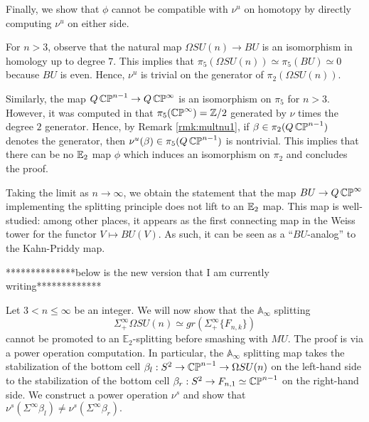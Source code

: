 Finally, we show that $\phi$ cannot be compatible with $\nu^u$ on homotopy by directly computing $\nu^u$ on either side.

For $n>3$, observe that the natural map $\Omega SU(n) \to BU$ is an isomorphism in homology up to degree $7$.  This implies that $\pi_5(\Omega SU(n)) \simeq \pi_5(BU) \simeq 0$ because $BU$ is even.  Hence, $\nu^u$ is trivial on the generator of $\pi_2(\Omega SU(n)).$  

Similarly, the map $Q\operatorname{\mathbb{CP}}^{n-1} \to Q\operatorname{\mathbb{CP}}^\infty$ is an isomorphism on $\pi_5$ for $n>3$.  However, it was computed in \cite[Theorem II.8]{Liulevicius} that $\pi_5(\operatorname{\mathbb{CP}}^{\infty})=\mathbb{Z}/2$ generated by $\nu$ times the degree $2$ generator.  Hence, by Remark \ref{rmk:multnu1}, if $\beta\in \pi_2(Q\operatorname{\mathbb{CP}}^{n-1})$ denotes the generator, then $\nu^u(\beta)\in \pi_5(Q\operatorname{\mathbb{CP}}^{n-1})$ is nontrivial.  This implies that there can be no $\operatorname{\mathbb{E}}_2$ map $\phi$ which induces an isomorphism on $\pi_2$ and concludes the proof.  

\begin{rmk}%
Taking the limit as $n\to\infty$, we obtain the statement that the map $BU\to Q\operatorname{\mathbb{CP}}^{\infty}$ implementing the splitting principle does not lift to an $\operatorname{\mathbb{E}}_2$ map.  This map is well-studied: among other places, it appears as the first connecting map in the Weiss tower for the functor $V\mapsto BU(V)$.  As such, it can be seen as a ``$BU$-analog'' to the Kahn-Priddy map.  
\end{rmk}



**************below is the new version that I am currently writing*************

Let $3< n\leq \infty$ be an integer.  We will now show that the $\mathbb{A}_\infty$ splitting $$\Sigma^{\infty}_+ \Omega SU(n) \simeq gr(\Sigma^{\infty}_+ \{ F_{n,k} \})$$ cannot be promoted to an $\mathbb{E}_2$-splitting before smashing with $MU$.  The proof is via a power operation computation.  In particular, the $\mathbb{A}_\infty$ splitting map takes the stabilization of the bottom cell $\beta_l : S^2 \to  \operatorname{\mathbb{CP}}^{n-1} \to \Omega SU(n)$ on the left-hand side to the stabilization of the bottom cell $\beta_r: S^2 \to F_{n,1} \simeq \operatorname{\mathbb{CP}}^{n-1}$ on the right-hand side.  We construct a power operation $\nu^{s}$ and show that $\nu^{s}(\Sigma^{\infty} \beta_l) \neq \nu^s(\Sigma^{\infty} \beta_r).$  

